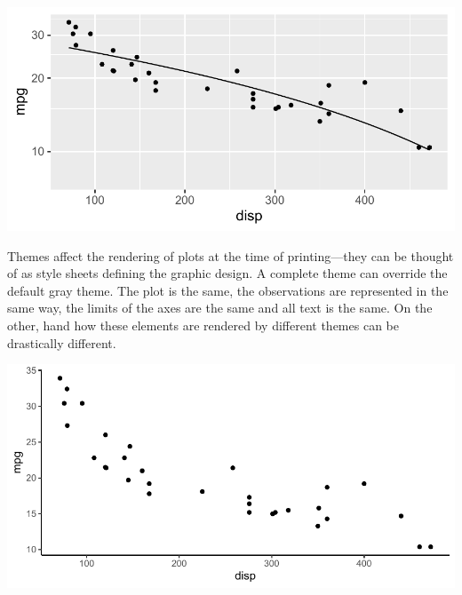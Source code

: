 \documentclass[krantz2]{krantz}\usepackage{knitr}
\begin{document}
\begin{knitrout}\footnotesize
{}\color{fgcolor}\begin{kframe}
\begin{alltt}
\hlstd{(} 
       \hlstd{(}    \hlopt{+}
  \hlstd{()} \hlopt{+}
  \hlstd{(} \hlstd{=} \hlstd{,}  \hlstd{=} \hlstd{,}   \hlopt{~}  \hlopt{+}
  \hlstd{(} \hlstd{=} \hlstd{)}
\end{alltt}
\end{kframe}

{\centering \includegraphics[width=.7\textwidth]{figure/pos-ggplot-basics-08-1} 

}


\end{knitrout}

Themes affect the rendering of plots at the time of printing---they can be thought of as style sheets defining the graphic design. A complete theme can override the default gray theme. The plot is the same, the observations are represented in the same way, the limits of the axes are the same and all text is the same. On the other, hand how these elements are rendered by different themes can be drastically different.

\begin{knitrout}\footnotesize
{}\color{fgcolor}\begin{kframe}
\begin{alltt}
\hlstd{(} 
       \hlstd{(}    \hlopt{+}
  \hlstd{()} \hlopt{+}
  \hlstd{()}
\end{alltt}
\end{kframe}

{\centering \includegraphics[width=.7\textwidth]{figure/pos-ggplot-basics-09-1} 

}


\end{knitrout}
\end{document}
